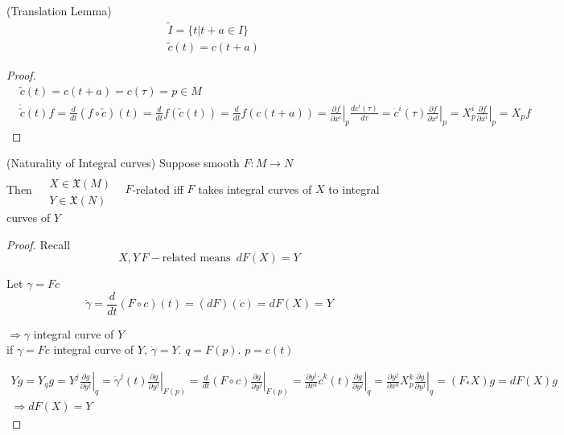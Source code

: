 \begin{lemma}[9.4] (Translation Lemma)
\[
\begin{aligned}
  & \widetilde{I} = \lbrace t | t + a \in I \rbrace \\ 
  & \widetilde{c}(t) = c(t+a)
\end{aligned}
\]



\end{lemma}

\begin{proof}
\[  
\begin{aligned}
&  \widetilde{c}(t) = c(t+a) = c(\tau) = p \in M \\ 
&  \dot{ \widetilde{c}}(t) f = \frac{d}{dt} (f\circ \widetilde{c})(t) = \frac{d}{dt} f(\widetilde{c}(t)) = \frac{d}{dt} f(c(t+a) ) = \left. \frac{ \partial f}{ \partial x^i } \right|_p \frac{d c^i(\tau) }{ d\tau } = \dot{c}^i(\tau)  \left. \frac{ \partial f}{ \partial x^i } \right|_p = X^i_p \left. \frac{ \partial f}{ \partial x^i} \right|_p = X_p f
\end{aligned}
\]
\end{proof}




\begin{proposition}[9.6] (Naturality of Integral curves)
  Suppose smooth $F: M \to N$ \\
  \quad Then $\begin{aligned} & \quad \\ 
    & X \in \mathfrak{X}(M) \\
    & Y \in \mathfrak{X}(N) \end{aligned}$ \quad \, $F$-related iff $F$ takes integral curves of $X$ to integral curves of $Y$
\end{proposition}

\begin{proof}
Recall 
\[
X,Y \, F-\text{related means } \, dF(X) =Y
\]

Let $\gamma = Fc$ 
\[
\dot{\gamma} = \frac{d}{dt} (F\circ c)(t) = (dF)(\dot{c}) = dF(X) = Y
\]

$\Longrightarrow \gamma $ integral curve of $Y$ \\

if $\gamma = Fc$ integral curve of $Y$, $\dot{\gamma} = Y$.  \quad $q = F(p)$.  $p=c(t)$

\[
\begin{gathered}
  Yg= Y_qg = Y^j \left. \frac{ \partial g}{ \partial y^j } \right|_q = \dot{\gamma}^j(t) \left. \frac{ \partial g}{ \partial y^j } \right|_{F(p)} = \frac{d}{dt} (F\circ c ) \left. \frac{ \partial g}{ \partial y^j } \right|_{F(p)} = \frac{ \partial y^j}{ \partial x^k } \dot{c}^k(t) \left. \frac{ \partial g}{ \partial y^j } \right|_q = \frac{ \partial y^j}{ \partial x^k} X^k_p \left. \frac{ \partial g}{ \partial y^j } \right|_q = (F_* X)g = dF(X)g \\
\Longrightarrow dF(X) = Y
\end{gathered}
\]
\end{proof}


